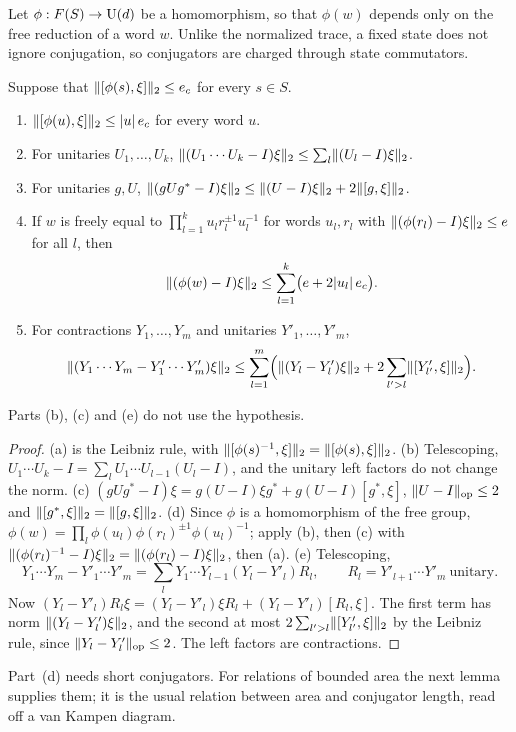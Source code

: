 Let $\phi:F(S)\to\mathrm U(d)$ be a homomorphism, so that $\phi(w)$ depends only on the free reduction of a word $w$. Unlike the normalized
trace, a fixed state does not ignore conjugation, so conjugators are charged through state commutators.

\begin{lemma}\label{lem:calculus}
Suppose that $\lVert [\phi(s),\xi]\rVert_2\le e_c$ for every $s\in S$.
\begin{enumerate}[label=(\alph*),itemsep=1pt]
\item $\lVert [\phi(u),\xi]\rVert_2\le\lvert u\rvert\,e_c$ for every word $u$.
\item For unitaries $U_1,\dots,U_k$, $\lVert (U_1\cdots U_k-I)\xi\rVert_2\le\sum_l\lVert (U_l-I)\xi\rVert_2$.
\item For unitaries $g,U$, $\lVert (gUg^*-I)\xi\rVert_2\le\lVert (U-I)\xi\rVert_2+2\lVert [g,\xi]\rVert_2$.
\item If $w$ is freely equal to $\prod_{l=1}^ku_lr_l^{\pm1}u_l^{-1}$ for words $u_l,r_l$ with $\lVert (\phi(r_l)-I)\xi\rVert_2\le e$ for all $l$,
then
\[
\lVert (\phi(w)-I)\xi\rVert_2\le\sum_{l=1}^k\bigl(e+2\lvert u_l\rvert\,e_c\bigr).
\]
\item For contractions $Y_1,\dots,Y_m$ and unitaries $Y'_1,\dots,Y'_m$,
\[
\lVert (Y_1\cdots Y_m-Y'_1\cdots Y'_m)\xi\rVert_2\le\sum_{l=1}^m\Bigl(\lVert (Y_l-Y'_l)\xi\rVert_2+2\sum_{l'>l}\lVert [Y'_{l'},\xi]\rVert_2\Bigr).
\]
\end{enumerate}
Parts (b), (c) and (e) do not use the hypothesis.
\end{lemma}

\begin{proof}
(a) is the Leibniz rule, with $\lVert [\phi(s)^{-1},\xi]\rVert_2=\lVert [\phi(s),\xi]\rVert_2$. (b) Telescoping, $U_1\cdots U_k-I=\sum_lU_1\cdots U_{l-1}(U_l-I)$,
and the unitary left factors do not change the norm. (c) $(gUg^*-I)\xi=g(U-I)\xi g^*+g(U-I)[g^*,\xi]$, $\lVert U-I\rVert_{\mathrm{op}}\le2$ and
$\lVert [g^*,\xi]\rVert_2=\lVert [g,\xi]\rVert_2$. (d) Since $\phi$ is a homomorphism of the free group, $\phi(w)=\prod_l\phi(u_l)\phi(r_l)^{\pm1}\phi(u_l)^{-1}$;
apply (b), then (c) with $\lVert (\phi(r_l)^{-1}-I)\xi\rVert_2=\lVert (\phi(r_l)-I)\xi\rVert_2$, then (a). (e) Telescoping,
\[
Y_1\cdots Y_m-Y'_1\cdots Y'_m=\sum_lY_1\cdots Y_{l-1}(Y_l-Y'_l)R_l,\qquad R_l=Y'_{l+1}\cdots Y'_m\ \text{unitary}.
\]
Now $(Y_l-Y'_l)R_l\xi=(Y_l-Y'_l)\xi R_l+(Y_l-Y'_l)[R_l,\xi]$. The first term has norm $\lVert (Y_l-Y'_l)\xi\rVert_2$, and the second at most
$2\sum_{l'>l}\lVert [Y'_{l'},\xi]\rVert_2$ by the Leibniz rule, since $\lVert Y_l-Y'_l\rVert_{\mathrm{op}}\le2$. The left factors are contractions.
\end{proof}

Part~(d) needs short conjugators. For relations of bounded area the next lemma supplies them; it is the usual relation between area and
conjugator length, read off a van Kampen diagram.

